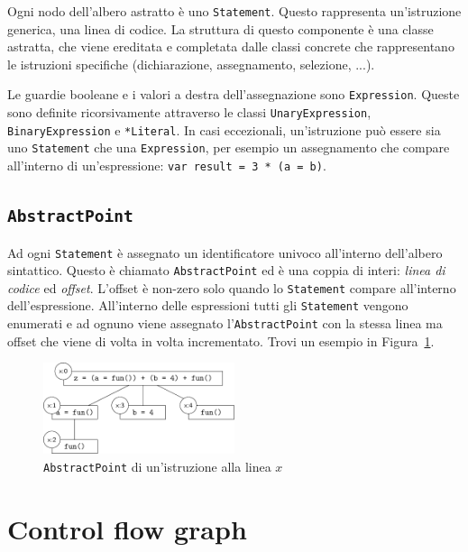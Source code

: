 Ogni nodo dell'albero astratto è uno \texttt{Statement}. Questo rappresenta un'istruzione generica, una linea di codice. La struttura di questo componente è una classe astratta, che viene ereditata e completata dalle classi concrete che rappresentano le istruzioni specifiche (dichiarazione, assegnamento, selezione, ...). 

Le guardie booleane e i valori a destra dell'assegnazione sono \texttt{Expression}. Queste sono definite ricorsivamente attraverso le classi \texttt{UnaryExpression}, \texttt{Binary\-Expression} e \texttt{*Literal}. In casi eccezionali, un'istruzione può essere sia uno \texttt{Statement} che una \texttt{Expression}, per esempio un assegnamento che compare all'interno di un'espressione: \texttt{var result = 3 * (a = b)}.

\subsection{\texttt{AbstractPoint}}

Ad ogni \texttt{Statement} è assegnato un identificatore univoco all'interno dell'albero sintattico. Questo è chiamato \texttt{AbstractPoint} ed è una coppia di interi: \emph{linea di codice} ed \emph{offset}. L'offset è non-zero solo quando lo \texttt{Statement} compare all'interno dell'espressione. All'interno delle espressioni tutti gli \texttt{Statement} vengono enumerati e ad ognuno viene assegnato l'\texttt{AbstractPoint} con la stessa linea ma offset che viene di volta in volta incrementato. Trovi un esempio in Figura~\ref{fig:realizzazione:label-hierarchy}.

\begin{figure}[htbp]
    \centering
    \includegraphics[width=0.5\textwidth]{scheme-generator/generated/label-hierarchy.pdf}
    \caption{\texttt{AbstractPoint} di un'istruzione alla linea $x$}
    \label{fig:realizzazione:label-hierarchy}
\end{figure}

\section{Control flow graph}

